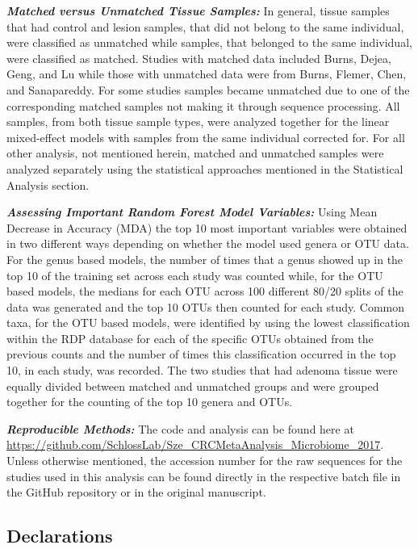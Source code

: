 \documentclass[12pt,]{article}
\begin{document}
\textbf{\emph{Matched versus Unmatched Tissue Samples:}} In general,
tissue samples that had control and lesion samples, that did not belong
to the same individual, were classified as unmatched while samples, that
belonged to the same individual, were classified as matched. Studies
with matched data included Burns, Dejea, Geng, and Lu while those with
unmatched data were from Burns, Flemer, Chen, and Sanapareddy. For some
studies samples became unmatched due to one of the corresponding matched
samples not making it through sequence processing. All samples, from
both tissue sample types, were analyzed together for the linear
mixed-effect models with samples from the same individual corrected for.
For all other analysis, not mentioned herein, matched and unmatched
samples were analyzed separately using the statistical approaches
mentioned in the Statistical Analysis section.

\textbf{\emph{Assessing Important Random Forest Model Variables:}} Using
Mean Decrease in Accuracy (MDA) the top 10 most important variables were
obtained in two different ways depending on whether the model used
genera or OTU data. For the genus based models, the number of times that
a genus showed up in the top 10 of the training set across each study
was counted while, for the OTU based models, the medians for each OTU
across 100 different 80/20 splits of the data was generated and the top
10 OTUs then counted for each study. Common taxa, for the OTU based
models, were identified by using the lowest classification within the
RDP database for each of the specific OTUs obtained from the previous
counts and the number of times this classification occurred in the top
10, in each study, was recorded. The two studies that had adenoma tissue
were equally divided between matched and unmatched groups and were
grouped together for the counting of the top 10 genera and OTUs.

\textbf{\emph{Reproducible Methods:}} The code and analysis can be found
here at
\url{https://github.com/SchlossLab/Sze_CRCMetaAnalysis_Microbiome_2017}.
Unless otherwise mentioned, the accession number for the raw sequences
for the studies used in this analysis can be found directly in the
respective batch file in the GitHub repository or in the original
manuscript.

\newpage

\subsection{Declarations}\label{declarations}
\end{document}
